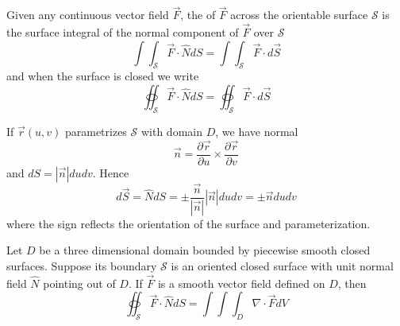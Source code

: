 \documentclass[12pt, a4paper, oneside, openright, titlepage]{book}
\begin{document}
\begin{appendices}
    
    \begin{defn}
        Given any continuous vector field $\vec{F}$, the  of $\vec{F}$ across the orientable surface $\mathcal{S}$ is the surface integral of the normal component of $\vec{F}$ over $\mathcal{S}$ \begin{equation}
            \int\int_{\mathcal{S}}\vec{F}\cdot \hat{N}dS = \int\int_{\mathcal{S}}\vec{F}\cdot d\vec{S}
        \end{equation}
        and when the surface is closed we write \begin{equation}
            \oiint_{\mathcal{S}}\vec{F}\cdot \hat{N}dS = \oiint_{\mathcal{S}}\vec{F}\cdot d\vec{S}
        \end{equation}
    \end{defn}
    
    
    \begin{rmk}
        If $\vec{r}(u,v)$ parametrizes $\mathcal{S}$ with domain $D$, we have normal \begin{equation}
            \vec{n} = \frac{\partial \vec{r}}{\partial u}\times \frac{\partial \vec{r}}{\partial v}
        \end{equation}
        and $dS = |\vec{n}|dudv$. Hence \begin{equation}
            d\vec{S} = \hat{N}dS = \pm\frac{\vec{n}}{|\vec{n}|}|\vec{n}|dudv = \pm\vec{n}dudv
        \end{equation}
        where the sign reflects the orientation of the surface and parameterization.
    \end{rmk}
    
    \begin{namthm}
        Let $D$ be a three dimensional domain bounded by piecewise smooth closed surfaces. Suppose its boundary $\mathcal{S}$ is an oriented closed surface with unit normal field $\hat{N}$ pointing out of $D$. If $\vec{F}$ is a smooth vector field defined on $D$, then \begin{equation}
            \oiint_{\mathcal{S}}\vec{F}\cdot \hat{N}dS = \int\int\int_D\nabla\cdot \vec{F}dV
        \end{equation}
    \end{namthm}
    
\end{appendices}
\end{document}
